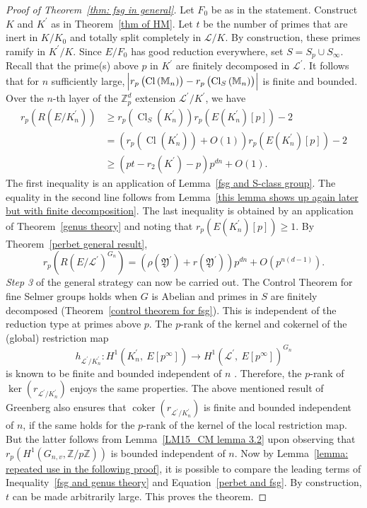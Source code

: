\documentclass{amsart}
\DeclareMathOperator{\Cl}{Cl}
\DeclareMathOperator{\coker}{coker}
\newcommand{\FF}{\mathbb M}
\newcommand{\ZZ}{\mathbb Z}
\newcommand{\Linf}{\mathcal{L}}
\newcommand{\Y}{\mathfrak Y}
\theoremstyle{definition}
\theoremstyle{remark}
\begin{document}
\begin{proof}[Proof of Theorem~\ref{thm: fsg in general}]
Let $F_0$ be as in the statement.
Construct $K$ and $K^\prime$ as in Theorem~\ref{thm of HM}.
Let $t$ be the number of primes that are inert in $K/K_0$ and totally split completely in $\Linf/K$.
By construction, these primes ramify in $K^\prime/K$.
Since $E/F_0$ has good reduction everywhere, set $S=S_p \cup S_\infty$.
Recall that the prime(s) above $p$ in $K^\prime$ are finitely decomposed in $\Linf^\prime$.
It follows that for $n$ sufficiently large, $\abs{r_p \left( \Cl\left(\FF_n\right)\right) - r_p \left( \Cl_S\left(\FF_n \right)\right)}$ is finite and bounded. 
Over the $n$-th layer of the $\ZZ_p^d$ extension $\Linf^\prime/K^\prime$, we have
\begin{align}
r_p \left( R \left( E/K_n^\prime \right)\right) &\geq r_p \left( \Cl_S \left( K_n^\prime \right)\right) r_p\left( E\left(K_n^\prime \right)[p] \right) -2 \\
&= \left( r_p \left( \Cl \left( K_n^\prime \right)\right) + O(1) \right) r_p\left(  E\left(K_n^\prime \right)[p] \right) -2\\
&\geq \left( pt - r_2\left(K^\prime\right) -p  \right)p^{dn} +O(1).
\label{fsg and genus theory}
\end{align}
The first inequality is an application of Lemma~\ref{fsg and S-class group}.
The equality in the second line follows from Lemma~\ref{this lemma shows up again later but with finite decomposition}.
The last inequality is obtained by an application of Theorem~\ref{genus theory} and noting that $r_p\left(  E\left(K_n^\prime \right)[p] \right) \geq 1$.
By Theorem~\ref{perbet general result},
\begin{equation}
\label{perbet and fsg}
r_p\left( R\left(E/\Linf^\prime\right)^{G_n}\right) = \left(\rho(\Y^\prime) +r(\Y^\prime)\right) p^{dn} + O(p^{n(d-1)}).
\end{equation}
\textit{Step 3} of the general strategy can now be carried out.
The Control Theorem for fine Selmer groups holds when $G$ is Abelian and primes in $S$ are finitely decomposed (Theorem~\ref{control theorem for fsg}).
This is independent of the reduction type at primes above $p$.
The $p$-rank of the kernel and cokernel of the (global) restriction map 
\[
h_{\Linf^\prime/ K_n^\prime}: H^1\left( K_n^\prime, \ E[p^\infty]\right) \rightarrow H^1\left( \Linf^\prime, \ E[p^\infty]\right)^{G_n} 
\]
is known to be finite and bounded independent of $n$ \cite[Proposition 3.4]{Gre03}.
Therefore, the $p$-rank of $\ker\left( r_{\Linf^\prime/ K_n^\prime}\right)$ enjoys the same properties.
The above mentioned result of Greenberg also ensures that $\coker\left( r_{\Linf^\prime/ K_n^\prime}\right)$ is finite and bounded independent of $n$, if the same holds for the $p$-rank of the kernel of the local restriction map.
But the latter follows from Lemma~\ref{LM15_CM lemma 3.2} upon observing that $r_p\left( H^1\left(G_{n,v}, \ZZ/p\ZZ\right)\right)$ is bounded independent of $n$.
Now by Lemma~\ref{lemma: repeated use in the following proof}, it is possible to compare the leading terms of Inequality~\ref{fsg and genus theory} and Equation~\ref{perbet and fsg}.
By construction, $t$ can be made arbitrarily large. 
This proves the theorem. 
\end{proof}
\end{document}
